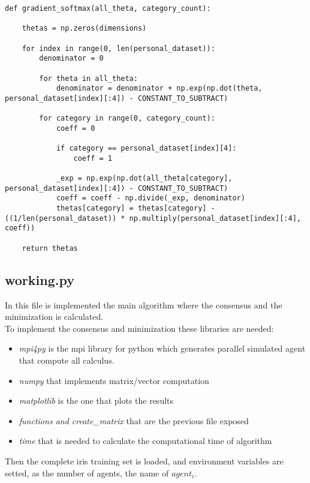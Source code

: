\documentclass[a4paper,11pt,oneside]{book}
\begin{document}
\begin{lstlisting}
def gradient_softmax(all_theta, category_count):

    thetas = np.zeros(dimensions)

    for index in range(0, len(personal_dataset)):
        denominator = 0

        for theta in all_theta:
            denominator = denominator + np.exp(np.dot(theta, personal_dataset[index][:4]) - CONSTANT_TO_SUBTRACT)

        for category in range(0, category_count):
            coeff = 0

            if category == personal_dataset[index][4]:
                coeff = 1

            _exp = np.exp(np.dot(all_theta[category], personal_dataset[index][:4]) - CONSTANT_TO_SUBTRACT)
            coeff = coeff - np.divide(_exp, denominator)
            thetas[category] = thetas[category] - ((1/len(personal_dataset)) * np.multiply(personal_dataset[index][:4], coeff))

    return thetas
\end{lstlisting}

\subsection {working.py}

In this file is implemented the main algorithm where the consensus and the minimization is calculated.\\

To implement the consensus and minimization these libraries are needed:
\begin{itemize}
    \item \textit{mpi4py} is the mpi library for python which generates parallel simulated agent that compute all calculus.
    \item \textit{numpy} that implements matrix/vector computation
    \item \textit{matplotlib} is the one that plots the results
    \item \textit{functions and create\_matrix} that are the previous file exposed
    \item \textit{time} that is needed to calculate the computational time of algorithm 
\end{itemize} 

Then the complete iris training set is loaded, and environment variables are setted, as the number of agents, the name of $agent_{i}$.
\end{document}
